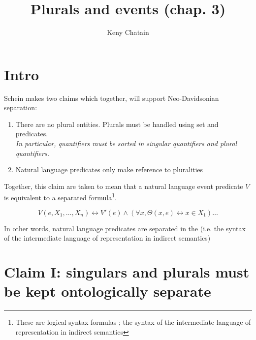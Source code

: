 



\endofdump



\title{Plurals and events (chap. 3)}
\author{Keny Chatain}


\maketitle

\section*{Intro}
Schein makes two claims which together, will support Neo-Davidsonian separation:

\begin{enumerate}
\item There are no plural entities. Plurals must be handled using set and predicates.\\
\emph{In particular, quantifiers must be sorted in singular quantifiers and plural quantifiers.}
\item Natural language predicates only make reference to pluralities
\end{enumerate}
%
Together, this claim are taken to mean that a natural language event predicate $V$ is equivalent to a separated formula\footnote{These are logical syntax formulas ; the syntax of the intermediate language of representation in indirect semantics}. 

$$V(e, X_1, \ldots, X_n) \leftrightarrow V'(e) \wedge \left( \forall x, \Theta(x, e) \leftrightarrow x\in X_1\right) \ldots $$

In other words, natural language predicates are separated in the  (i.e. the syntax of the intermediate language of representation in indirect semantics)

\section*{Claim I: singulars and plurals must be kept ontologically separate}

